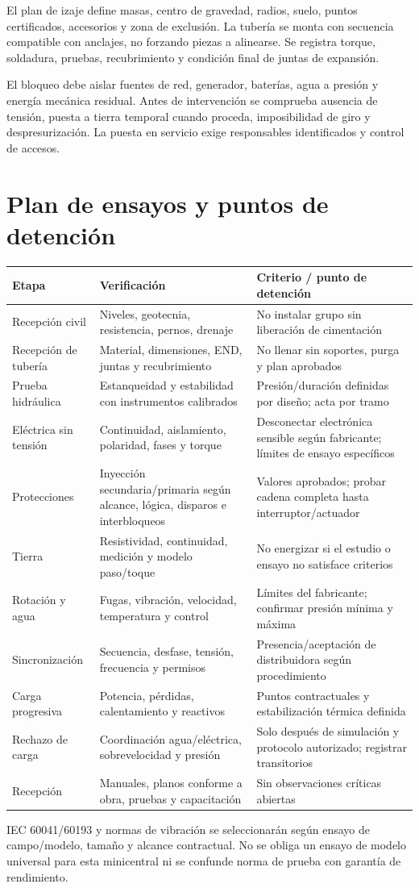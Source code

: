 El plan de izaje define masas, centro de gravedad, radios, suelo, puntos certificados, accesorios y zona de exclusión. La tubería se monta con secuencia compatible con anclajes, no forzando piezas a alinearse. Se registra torque, soldadura, pruebas, recubrimiento y condición final de juntas de expansión.

El bloqueo debe aislar fuentes de red, generador, baterías, agua a presión y energía mecánica residual. Antes de intervención se comprueba ausencia de tensión, puesta a tierra temporal cuando proceda, imposibilidad de giro y despresurización. La puesta en servicio exige responsables identificados y control de accesos.

\section{Plan de ensayos y puntos de detención}
\begin{longtable}{L{3.2cm}L{6.2cm}L{5cm}}
\toprule Etapa & Verificación & Criterio / punto de detención\\\midrule
Recepción civil & Niveles, geotecnia, resistencia, pernos, drenaje & No instalar grupo sin liberación de cimentación\\
Recepción de tubería & Material, dimensiones, END, juntas y recubrimiento & No llenar sin soportes, purga y plan aprobados\\
Prueba hidráulica & Estanqueidad y estabilidad con instrumentos calibrados & Presión/duración definidas por diseño; acta por tramo\\
Eléctrica sin tensión & Continuidad, aislamiento, polaridad, fases y torque & Desconectar electrónica sensible según fabricante; límites de ensayo específicos\\
Protecciones & Inyección secundaria/primaria según alcance, lógica, disparos e interbloqueos & Valores aprobados; probar cadena completa hasta interruptor/actuador\\
Tierra & Resistividad, continuidad, medición y modelo paso/toque & No energizar si el estudio o ensayo no satisface criterios\\
Rotación y agua & Fugas, vibración, velocidad, temperatura y control & Límites del fabricante; confirmar presión mínima y máxima\\
Sincronización & Secuencia, desfase, tensión, frecuencia y permisos & Presencia/aceptación de distribuidora según procedimiento\\
Carga progresiva & Potencia, pérdidas, calentamiento y reactivos & Puntos contractuales y estabilización térmica definida\\
Rechazo de carga & Coordinación agua/eléctrica, sobrevelocidad y presión & Solo después de simulación y protocolo autorizado; registrar transitorios\\
Recepción & Manuales, planos conforme a obra, pruebas y capacitación & Sin observaciones críticas abiertas\\
\bottomrule
\end{longtable}
IEC 60041/60193 y normas de vibración se seleccionarán según ensayo de campo/modelo, tamaño y alcance contractual. No se obliga un ensayo de modelo universal para esta minicentral ni se confunde norma de prueba con garantía de rendimiento.

